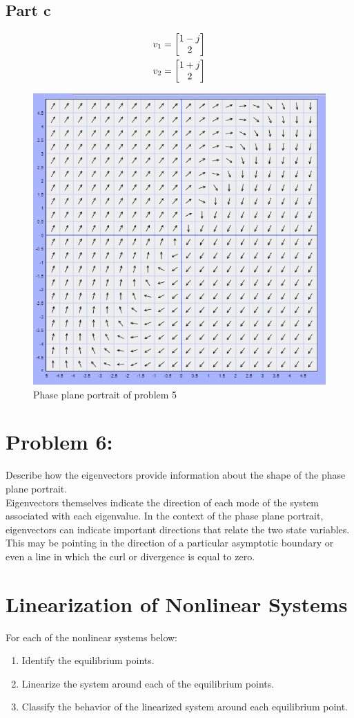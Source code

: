 \documentclass[]{article}
\begin{document}
\subsection{Part c}


\begin{align*}
	v_1
	&= \mqty[1-j\\2]\\
	v_2
	&= \mqty[1+j\\2]
\end{align*}



\begin{figure}[p]
	\centering
	\includegraphics[width=0.7\linewidth]{fig/pblm5}
	\caption{Phase plane portrait of problem 5}
	\label{fig:pblm5}
\end{figure}




\section{Problem 6:}
Describe how the eigenvectors provide information about the shape of the phase plane portrait.\\

Eigenvectors themselves indicate the direction of each mode of the system associated with each eigenvalue. In the context of the phase plane portrait, eigenvectors can indicate important directions that relate the two state variables. This may be pointing in the direction of a particular asymptotic boundary or even a line in which the curl or divergence is equal to zero.




\newpage
\section*{Linearization of Nonlinear Systems}
For each of the nonlinear systems below:
\begin{enumerate}
	\item Identify the equilibrium points.
	\item Linearize the system around each of the equilibrium points.
	\item Classify the behavior of the linearized system around each equilibrium point.
\end{enumerate}
\end{document}

